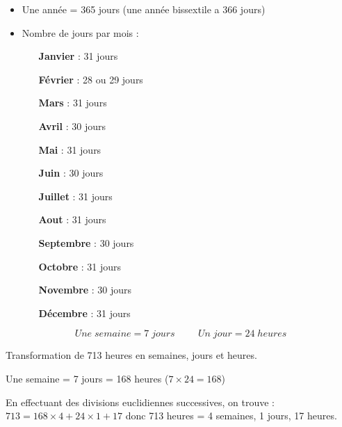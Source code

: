 \documentclass[a4paper,dvipsnames]{article}
\begin{document}
\begin{Def}
\begin{itemize}
\item Une année = 365 jours (une année bissextile a 366 jours)
\item Nombre de jours par mois :

\begin{minipage}{.3\linewidth}
\begin{itemize}
\item[\textbf{Janvier}] : 31 jours
\item[\textbf{Février}]  : 28 ou 29 jours
\item[\textbf{Mars}] : 31 jours
\item[\textbf{Avril}] : 30 jours
\end{itemize}
\end{minipage}
\begin{minipage}{.3\linewidth}
\begin{itemize}
\item[\textbf{Mai}] : 31 jours
\item[\textbf{Juin}]  : 30 jours
\item[\textbf{Juillet}] : 31 jours
\item[\textbf{Aout}] : 31 jours
\end{itemize}
\end{minipage}
\begin{minipage}{.3\linewidth}
\begin{itemize}
\item[\textbf{Septembre}] : 30 jours
\item[\textbf{Octobre}]  : 31 jours
\item[\textbf{Novembre}] : 30 jours
\item[\textbf{Décembre}] : 31 jours
\end{itemize}
\end{minipage}
\end{itemize}
\end{Def}

\begin{Def}
\[Une \;semaine = 7 \;jours \hspace{1cm} Un\; jour = 24 \;heures\]
\end{Def}

\begin{Mt}
Transformation de 713 heures en semaines, jours et heures.

Une semaine = 7 jours = 168 heures ($7\times24=168$)

En effectuant des divisions euclidiennes successives, on trouve : $713=168\times4+24\times1+17$ donc 713 heures = 4 semaines, 1 jours, 17 heures.
\end{Mt}
\end{document}
